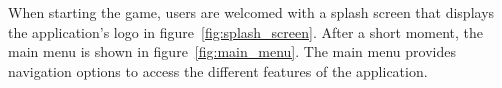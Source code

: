 When starting the game, users are welcomed with a splash screen that displays the application's logo in figure~\ref{fig:splash_screen}. After a short moment, the main menu is shown in figure~\ref{fig:main_menu}. The main menu provides navigation options to access the different features of the application.
\begin{figure}[h]
    \centering
    \begin{subfigure}[b]{0.27\textwidth}
        \centering

\end{subfigure}
\end{figure}
